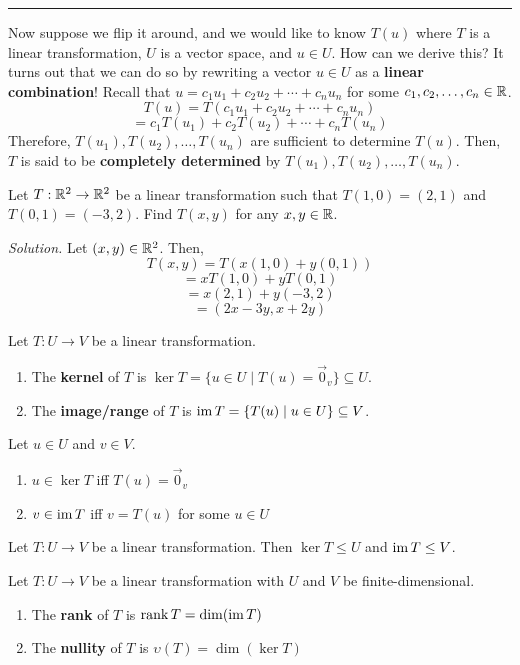 \noindent\rule{\textwidth}{0.4pt}

Now suppose we flip it around, and we would like to know $T(u)$ where $T$ is a linear transformation, $U$ is a vector space, and $u \in U$. How can we derive this? It turns out that we can do so by rewriting a vector $u \in U$ as a \textbf{linear combination}! Recall that $u = c_1u_1 + c_2u_2 + \cdots + c_nu_n$ for some $c_1, c_2, \dots, c_n \in \mathbb{R}$.
$$T(u) = T(c_1u_1 + c_2u_2 + \cdots + c_nu_n)$$
$$=c_1T(u_1) + c_2T(u_2) + \cdots + c_nT(u_n)$$
Therefore, $T(u_1), T(u_2), \dots, T(u_n)$ are sufficient to determine $T(u)$. Then, $T$ is said to be \textbf{completely determined} by $T(u_1), T(u_2), \dots, T(u_n)$.


\newpage
\begin{example}
Let $T: \mathbb{R}^2 \to \mathbb{R}^2$ be a linear transformation such that $T(1, 0) = (2, 1)$ and $T(0, 1) = (-3, 2)$. Find $T(x, y)$ for any $x, y \in \mathbb{R}$.

\textit{Solution.} Let $(x, y) \in \mathbb{R}^2$. Then,
$$T(x, y) = T(x(1, 0) + y(0, 1))$$
$$=xT(1, 0) + yT(0, 1)$$
$$=x(2, 1) + y(-3, 2)$$
$$=\boxed{(2x - 3y, x + 2y)}$$
\end{example}

\begin{definition}
Let $T: U \to V$ be a linear transformation. 
\begin{enumerate}
    \item The \textbf{kernel} of $T$ is $\ker T = \{u \in U \mid T(u) = \vec{0}_v\} \subseteq U$.
    \item The \textbf{image/range} of $T$ is $\operatorname{im} T = \{T(u) \mid u \in U\} \subseteq V$.
\end{enumerate}
\end{definition}

\begin{remark}
Let $u \in U$ and $v \in V$.
\begin{enumerate}
    \item $u \in \ker T$ iff $T(u) = \vec{0}_v$
    \item $v \in \operatorname{im} T$ iff $v = T(u)$ for some $u \in U$
\end{enumerate}
\end{remark}

\begin{theorem}
Let $T: U \to V$ be a linear transformation. Then $\ker T \leq U$ and $\operatorname{im} T \leq V$.
\end{theorem}

\begin{definition}
Let $T: U \to V$ be a linear transformation with $U$ and $V$ be finite-dimensional.
\begin{enumerate}
    \item The \textbf{rank} of $T$ is $\rank T = \dim(\operatorname{im} T)$
    \item The \textbf{nullity} of $T$ is $\upsilon(T) = \dim(\ker T)$
\end{enumerate}
\end{definition}

